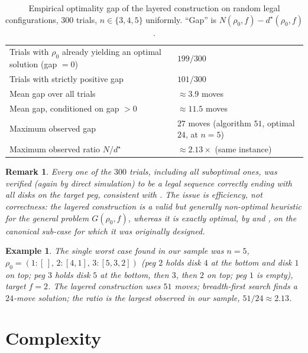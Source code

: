 \documentclass[11pt]{article}
\newtheorem{remark}[theorem]{Remark}
\newtheorem{example}[theorem]{Example}
\begin{document}
\begin{table}[h]
\centering
\caption{Empirical optimality gap of the layered construction on random
legal configurations, $300$ trials, $n \in \{3,4,5\}$ uniformly. ``Gap'' is
$N(\rho_0,f)-d^\star(\rho_0,f)$.}
\label{tab:suboptimal}
\begin{tabular}{@{}p{}p{}@{}}
\toprule
Trials with $\rho_0$ already yielding an optimal solution (gap $=0$) & $199/300$ \\
Trials with strictly positive gap & $101/300$ \\
Mean gap over all trials & $\approx 3.9$ moves \\
Mean gap, conditioned on gap $>0$ & $\approx 11.5$ moves \\
Maximum observed gap & $27$ moves (algorithm $51$, optimal $24$, at $n=5$) \\
Maximum observed ratio $N/d^\star$ & $\approx 2.13\times$ (same instance) \\
\bottomrule
\end{tabular}
\end{table}

\begin{remark}
Every one of the $300$ trials, including all suboptimal ones, was verified
(again by direct simulation) to be a \emph{legal} sequence correctly ending
with all disks on the target peg, consistent with . The
issue is efficiency, not correctness: the layered construction is a valid
but generally non-optimal heuristic for the general problem $G(\rho_0,f)$,
whereas it is exactly optimal, by  and
, on the canonical sub-case for which it was originally
designed.
\end{remark}

\begin{example}
The single worst case found in our sample was $n=5$,
$\rho_0 = (1{:}[\,], \, 2{:}[4,1], \, 3{:}[5,3,2])$ (peg $2$ holds disk $4$
at the bottom and disk $1$ on top; peg $3$ holds disk $5$ at the bottom,
then $3$, then $2$ on top; peg $1$ is empty), target $f=2$. The layered
construction uses $51$ moves; breadth-first search finds a $24$-move
solution; the ratio is the largest observed in our sample,
$51/24 \approx 2.13$.
\end{example}

\section{Complexity}
\label{sec:complexity}
\end{document}
